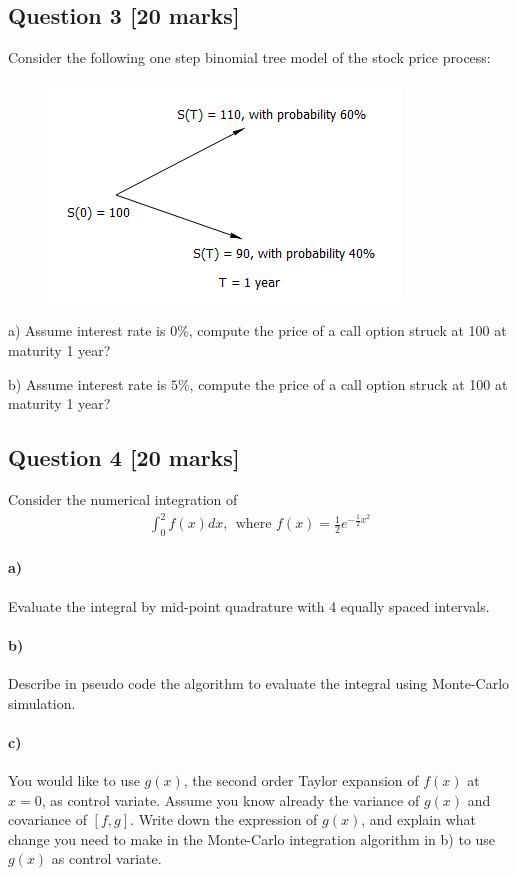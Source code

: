 \documentclass[11pt,a4paper,hidelinks,fleqn]{article}            %
\begin{document}
\subsection*{Question 3 [20 marks]}
Consider the following one step binomial tree model of the stock price process:
\begin{figure}[h]
\includegraphics[scale=0.9]{./4}
\end{figure}

a) Assume interest rate is $0\%$, compute the price of a call option struck at 100 at maturity 1 year?

b) Assume interest rate is $5\%$, compute the price of a call option struck at 100 at maturity 1 year?


\subsection*{Question 4 [20 marks]} 
Consider the numerical integration of 
\begin{align*}
\int_0^{2} f(x) dx, ~~\text{where~} f(x) = \frac{1}{2} e^{-\frac12x^2}
\end{align*}

\paragraph{a)} Evaluate the integral by mid-point quadrature with 4 equally spaced intervals. 

\paragraph{b)} Describe in pseudo code the algorithm to evaluate the integral using Monte-Carlo simulation.
 

\paragraph{c)} You would like to use $g(x)$, the second order Taylor 
expansion of $f(x)$ at $x=0$, as control variate. 
Assume you know already the variance of $g(x)$ and covariance of $[f, g]$.
Write down the expression of $g(x)$, 
and explain what change you need to make in the Monte-Carlo integration algorithm in b) to use $g(x)$ as control variate.
\end{document}
